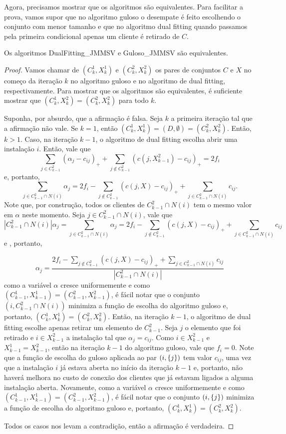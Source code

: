 Agora, precisamos mostrar que os algoritmos são equivalentes. Para facilitar a prova, vamos supor que no algoritmo guloso o desempate é feito escolhendo o conjunto com menor tamanho e que no algoritmo dual fitting quando passamos pela primeira condicional apenas um cliente é retirado de $C$.

\begin{theorem}
Os algoritmos {\sc DualFitting\_JMMSV} e {\sc Guloso\_JMMSV} são equivalentes.
\end{theorem}

\begin{proof}
Vamos chamar de $(C_k^1,X_k^1)$ e $(C_k^2,X_k^2)$ os pares de conjuntos $C$ e $X$ no começo da iteração $k$ no algoritmo guloso e no algoritmo de dual fitting, respectivamente. Para mostrar que os algoritmos são equivalentes, é suficiente mostrar que $(C_k^1,X_k^2) = (C_k^2,X_k^2)$ para todo $k$.

Suponha, por absurdo, que a afirmação é falsa. Seja $k$ a primeira iteração tal que a afirmação não vale. Se $k=1$, então $(C_k^1,X_k^1) = (D,\emptyset) = (C_k^2,X_k^2)$.
Então, $k>1$.
Caso, na iteração $k-1$, o algoritmo de dual fitting escolha abrir uma instalação $i$. Então, vale que 
\[
    \sum_{j \in C_{k-1}^2} (\alpha_j - c_{ij})_+ + \sum_{j \not \in C_{k-1}^2}(c(j,X_{k-1}^2) - c_{ij})_+ = 2f_i
\] 
e, portanto,
\[
    \sum_{j \in C_{k-1}^2 \cap N(i)} \alpha_j = 2f_i - \sum_{j \not \in C_{k-1}^2} (c(j,X)- c_{ij})_+  + \sum_{j \in  C_{k-1}^2 \cap N(i)} c_{ij}. 
\]
Note que, por construção, todos os clientes de  $C_{k-1}^2 \cap N(i)$ tem o mesmo valor em $\alpha$ neste momento. Seja $j \in C_{k-1}^2 \cap N(i)$, vale que
\[
    |C_{k-1}^2 \cap N(i)| \alpha_j = \sum_{j \in C_{k-1}^2 \cap N(i)} \alpha_j = 2f_i - \sum_{j \not \in C_{k-1}^2} (c(j,X)- c_{ij})_+  + \sum_{j \in  C_{k-1}^2 \cap N(i)} c_{ij}
\]
e , portanto,

\[
    \alpha_j = \frac{ 2f_i - \sum_{j \not \in C_{k-1}^2} (c(j,X)- c_{ij})_+  + \sum_{j \in  C_{k-1}^2 \cap N(i)} c_{ij}}{|C_{k-1}^2 \cap N(i)|}
\]
como a variável $\alpha$ cresce uniformemente e como $(C_{k-1}^1,X_{k-1}^1) = (C_{k-1}^2,X_{k-1}^2)$, é fácil notar que o conjunto $(i,C_{k-1}^2 \cap N(i))$ minimiza a função de escolha do algoritmo guloso e, portanto, $(C_{k}^1,X_{k}^1) = (C_{k}^2,X_{k}^2)$. Então, na iteração $k-1$, o algoritmo de dual fitting escolhe apenas retirar um elemento de $C_{k-1}^2$. Seja $j$ o elemento que foi retirado e $i \in X_{k-1}^2$ a instalação tal que $\alpha_j = c_{ij}$. Como $i \in X_{k-1}^2$ e $X_{k-1}^1 = X_{k-1}^2$, então na iteração $k-1$ do algoritmo guloso, vale que $f_i = 0$. Note que a função de escolha do guloso aplicada ao par $(i,\{j\})$ tem valor $c_{ij}$, uma vez que a instalação $i$ já estava aberta no início da iteração $k-1$ e, portanto, não haverá melhora no custo de conexão dos clientes que já estavam ligados a alguma instalação aberta. Novamente, como a variável $\alpha$ cresce uniformemente e como $(C_{k-1}^1,X_{k-1}^1) = (C_{k-1}^2,X_{k-1}^2)$, é fácil notar que o conjunto $(i,\{j\})$ minimiza a função de escolha do algoritmo guloso e, portanto, $(C_{k}^1,X_{k}^1) = (C_{k}^2,X_{k}^2)$.

Todos os casos nos levam a contradição, então a afirmação é verdadeira.   
\end{proof}